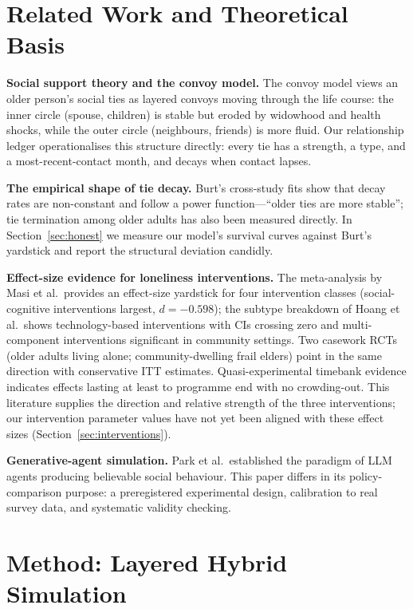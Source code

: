 \documentclass[10pt,twocolumn]{article}
\begin{document}
\section{Related Work and Theoretical Basis}
\textbf{Social support theory and the convoy model.} The convoy model\citep{kahn1980convoys} views an older person's social ties as layered convoys moving through the life course: the inner circle (spouse, children) is stable but eroded by widowhood and health shocks, while the outer circle (neighbours, friends) is more fluid. Our relationship ledger operationalises this structure directly: every tie has a strength, a type, and a most-recent-contact month, and decays when contact lapses.

\textbf{The empirical shape of tie decay.} Burt's cross-study fits show that decay rates are non-constant and follow a power function---``older ties are more stable''\citep{burt2000decay}; tie termination among older adults has also been measured directly\citep{kleinikkink1999broken}. In Section~\ref{sec:honest} we measure our model's survival curves against Burt's yardstick and report the structural deviation candidly.

\textbf{Effect-size evidence for loneliness interventions.} The meta-analysis by Masi et al.\ provides an effect-size yardstick for four intervention classes (social-cognitive interventions largest, $d=-0.598$)\citep{masi2011meta}; the subtype breakdown of Hoang et al.\ shows technology-based interventions with CIs crossing zero and multi-component interventions significant in community settings\citep{hoang2022interventions}. Two casework RCTs (older adults living alone\citep{ristolainen2020effects}; community-dwelling frail elders\citep{taube2018case}) point in the same direction with conservative ITT estimates. Quasi-experimental timebank evidence indicates effects lasting at least to programme end with no crowding-out\citep{lu2024timebank}. This literature supplies the direction and relative strength of the three interventions; our intervention parameter values have not yet been aligned with these effect sizes (Section~\ref{sec:interventions}).

\textbf{Generative-agent simulation.} Park et al.\ established the paradigm of LLM agents producing believable social behaviour\citep{park2023generative}. This paper differs in its policy-comparison purpose: a preregistered experimental design, calibration to real survey data, and systematic validity checking.

\section{Method: Layered Hybrid Simulation}
\end{document}
